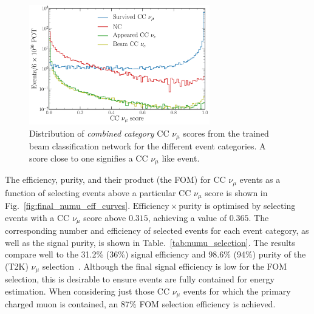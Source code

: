 \begin{figure} %
    \includegraphics[width=0.7\textwidth]{diagrams/7-results/final_beam_numu_outputs.pdf}
    \caption[Distribution of CC $\nu_{\mu}$ scores from the trained beam classification network]
    {Distribution of \emph{combined category} CC $\nu_{\mu}$ scores from the trained beam
        classification network for the different event categories. A score close to one signifies
        a CC $\nu_{\mu}$ like event.}
    \label{fig:final_beam_numu_outputs}
\end{figure}

The efficiency, purity, and their product (the FOM) for CC $\nu_{\mu}$ events as a function of
selecting events above a particular CC $\nu_{\mu}$ score is shown in
Fig.~\ref{fig:final_numu_eff_curves}. $\mathrm{Efficiency}\times\mathrm{purity}$ is optimised by
selecting events with a CC $\nu_{\mu}$ score above $0.315$, achieving a value of $0.365$. The
corresponding number and efficiency of selected events for each event category, as well as the
signal purity, is shown in Table.~\ref{tab:numu_selection}. The results compare well to the 31.2\%
(36\%) signal efficiency and 98.6\% (94\%) purity of the \nova (T2K) $\nu_{\mu}$
selection~\cite{acero2019, abe2015}. Although the final signal efficiency is low for the FOM
selection, this is desirable to ensure events are fully contained for energy estimation. When
considering just those CC $\nu_{\mu}$ events for which the primary charged muon is contained, an
87\% FOM selection efficiency is achieved.

